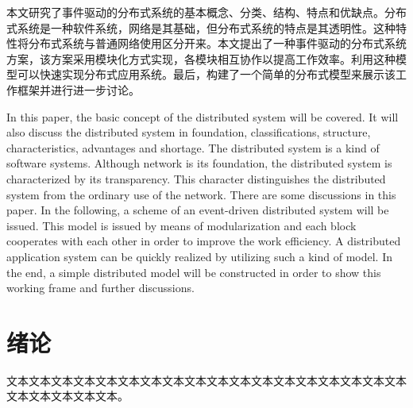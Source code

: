 \documentclass{suse-cs-thesis}
\begin{document}
\makecover

\makedeclaration

\makeintegrity

\begin{cabstract}
本文研究了事件驱动的分布式系统的基本概念、分类、结构、特点和优缺点。分布式系统是一种软件系统，网络是其基础，但分布式系统的特点是其透明性。这种特性将分布式系统与普通网络使用区分开来。本文提出了一种事件驱动的分布式系统方案，该方案采用模块化方式实现，各模块相互协作以提高工作效率。利用这种模型可以快速实现分布式应用系统。最后，构建了一个简单的分布式模型来展示该工作框架并进行进一步讨论。

\end{cabstract}

\begin{eabstract}
In this paper, the basic concept of the distributed system will be covered. It will also discuss the distributed system in foundation, classifications, structure, characteristics, advantages and shortage. The distributed system is a kind of software systems. Although network is its foundation, the distributed system is characterized by its transparency. This character distinguishes the distributed system from the ordinary use of the network. There are some discussions in this paper. In the following, a scheme of an event-driven distributed system will be issued. This model is issued by means of modularization and each block cooperates with each other in order to improve the work efficiency. A distributed application system can be quickly realized by utilizing such a kind of model. In the end, a simple distributed model will be constructed in order to show this working frame and further discussions.

\end{eabstract}

\hideheader
\tableofcontents
\showheader
\clearpage

\par\setlength{\baselineskip}{22pt}

\chapter{绪论}

文本文本文本文本文本文本文本文本文本文本文本文本文本文本文本文本文本文本文本文本文本文本文本。
\end{document}
